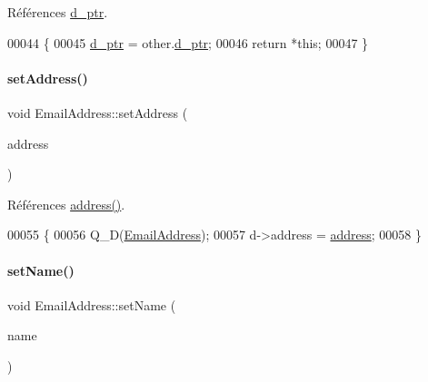 Références \hyperlink{class_simple_mail_1_1_email_address_a27188c75c77a942e79cac0420788f214}{d\+\_\+ptr}.


\begin{DoxyCode}
00044 \{
00045     \hyperlink{class_simple_mail_1_1_email_address_a27188c75c77a942e79cac0420788f214}{d\_ptr} = other.\hyperlink{class_simple_mail_1_1_email_address_a27188c75c77a942e79cac0420788f214}{d\_ptr};
00046     \textcolor{keywordflow}{return} *\textcolor{keyword}{this};
00047 \}
\end{DoxyCode}
\mbox{\label{class_simple_mail_1_1_email_address_aab4a5642e2779dce05aafd267d5729ae}} 
\paragraph{\texorpdfstring{set\+Address()}{setAddress()}}
{\footnotesize\ttfamily void Email\+Address\+::set\+Address (\begin{DoxyParamCaption}\item[{const Q\+String \&}]{address }\end{DoxyParamCaption})}



Références \hyperlink{class_simple_mail_1_1_email_address_a426faf41f9f1c56014a97eec4d37ba4a}{address()}.


\begin{DoxyCode}
00055 \{
00056     Q\_D(\hyperlink{class_simple_mail_1_1_email_address}{EmailAddress});
00057     d->address = \hyperlink{class_simple_mail_1_1_email_address_a426faf41f9f1c56014a97eec4d37ba4a}{address};
00058 \}
\end{DoxyCode}
\mbox{\label{class_simple_mail_1_1_email_address_a09d30bfa2caf56202f78bbc5f7ed543e}} 
\paragraph{\texorpdfstring{set\+Name()}{setName()}}
{\footnotesize\ttfamily void Email\+Address\+::set\+Name (\begin{DoxyParamCaption}\item[{const Q\+String \&}]{name }\end{DoxyParamCaption})}



